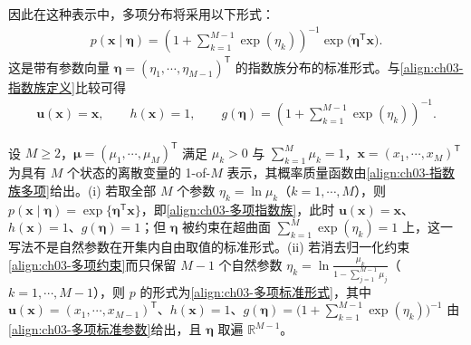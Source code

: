 \documentclass[../../main.tex]{subfiles}
\begin{document}
因此在这种表示中，多项分布将采用以下形式：
\begin{align}
p(\boldsymbol{x}\mid\boldsymbol{\eta})=\left(1+\sum_{k=1}^{M-1}\exp(\eta_k)\right)^{-1}\exp\bigl(\boldsymbol{\eta}^{\mathsf{T}}\boldsymbol{x}\bigr).
\label{align:ch03-多项标准形式}
\end{align}
这是带有参数向量 $\boldsymbol{\eta}=(\eta_1,\cdots,\eta_{M-1})^{\mathsf{T}}$ 的指数族分布的标准形式。与\eqref{align:ch03-指数族定义}比较可得
\begin{align}
\boldsymbol{u}(\boldsymbol{x})=\boldsymbol{x},\qquad h(\boldsymbol{x})=1,\qquad g(\boldsymbol{\eta})=\left(1+\sum_{k=1}^{M-1}\exp(\eta_k)\right)^{-1}.
\label{align:ch03-多项标准参数}
\end{align}

\begin{proposition}[多项（类别）分布的指数族形式]\label{proposition:ch03-多项指数族}
设 $M\geqslant2$，$\boldsymbol{\mu}=(\mu_1,\cdots,\mu_M)^{\mathsf{T}}$ 满足 $\mu_k>0$ 与 $\sum_{k=1}^{M}\mu_k=1$，$\boldsymbol{x}=(x_1,\cdots,x_M)^{\mathsf{T}}$ 为具有 $M$ 个状态的离散变量的 1-of-$M$ 表示，其概率质量函数由\eqref{align:ch03-指数族多项}给出。(i) 若取全部 $M$ 个参数 $\eta_k=\ln\mu_k$（$k=1,\cdots,M$），则 $p(\boldsymbol{x}\mid\boldsymbol{\eta})=\exp\{\boldsymbol{\eta}^{\mathsf{T}}\boldsymbol{x}\}$，即\eqref{align:ch03-多项指数族}，此时 $\boldsymbol{u}(\boldsymbol{x})=\boldsymbol{x}$、$h(\boldsymbol{x})=1$、$g(\boldsymbol{\eta})=1$；但 $\boldsymbol{\eta}$ 被约束在超曲面 $\sum_{k=1}^{M}\exp(\eta_k)=1$ 上，这一写法不是自然参数在开集内自由取值的标准形式。(ii) 若消去归一化约束\eqref{align:ch03-多项约束}而只保留 $M-1$ 个自然参数 $\eta_k=\ln\frac{\mu_k}{1-\sum_{j=1}^{M-1}\mu_j}$（$k=1,\cdots,M-1$），则 $p$ 的形式为\eqref{align:ch03-多项标准形式}，其中 $\boldsymbol{u}(\boldsymbol{x})=(x_1,\cdots,x_{M-1})^{\mathsf{T}}$、$h(\boldsymbol{x})=1$、$g(\boldsymbol{\eta})=\bigl(1+\sum_{k=1}^{M-1}\exp(\eta_k)\bigr)^{-1}$ 由\eqref{align:ch03-多项标准参数}给出，且 $\boldsymbol{\eta}$ 取遍 $\mathbb{R}^{M-1}$。
\end{proposition}
\end{document}
